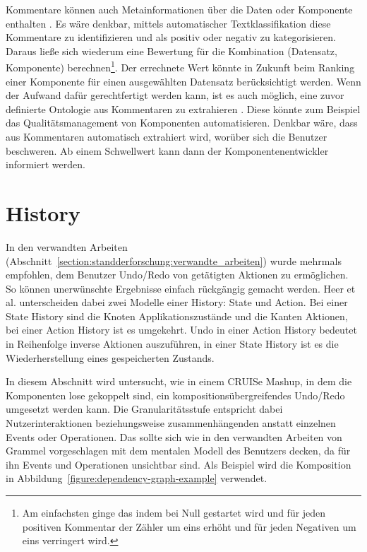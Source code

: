 \documentclass[
	headsepline,
	footsepline,
	fontsize=12pt,
	bibliography=totoc
]{scrbook}
\begin{document}

Kommentare können auch Metainformationen über die Daten oder Komponente enthalten \cite{Chen2009}. Es wäre denkbar, mittels automatischer Textklassifikation \cite{Sebastiani2002} diese Kommentare zu identifizieren und als positiv oder negativ zu kategorisieren. Daraus ließe sich wiederum eine Bewertung für die Kombination (Datensatz, Komponente) berechnen\footnote{Am einfachsten ginge das indem bei Null gestartet wird und für jeden positiven Kommentar der Zähler um eins erhöht und für jeden Negativen um eins verringert wird.}. Der errechnete Wert könnte in Zukunft beim Ranking einer Komponente für einen ausgewählten Datensatz berücksichtigt werden. Wenn der Aufwand dafür gerechtfertigt werden kann, ist es auch möglich, eine zuvor definierte Ontologie aus Kommentaren zu extrahieren \cite{Alani2003}. Diese könnte zum Beispiel das Qualitätsmanagement von Komponenten automatisieren. Denkbar wäre, dass aus Kommentaren automatisch extrahiert wird, worüber sich die Benutzer beschweren. Ab einem Schwellwert kann dann der Komponentenentwickler informiert werden.

\section{History}
\label{section:konzeption:history}


In den verwandten Arbeiten (Abschnitt~\ref{section:standderforschung:verwandte_arbeiten}) wurde mehrmals empfohlen, dem Benutzer Undo/Redo von getätigten Aktionen zu ermöglichen. So können unerwünschte Ergebnisse einfach rückgängig gemacht werden. Heer et al. \cite{Heer2008} unterscheiden dabei zwei Modelle einer History: State und Action. Bei einer State History sind die Knoten Applikationszustände und die Kanten Aktionen, bei einer Action History ist es umgekehrt. Undo in einer Action History bedeutet in Reihenfolge inverse Aktionen auszuführen, in einer State History ist es die Wiederherstellung eines gespeicherten Zustands.

In diesem Abschnitt wird untersucht, wie in einem CRUISe Mashup, in dem die Komponenten lose gekoppelt sind, ein kompositionsübergreifendes Undo/Redo umgesetzt werden kann. Die Granularitätsstufe entspricht dabei Nutzerinteraktionen beziehungsweise zusammenhängenden anstatt einzelnen Events oder Operationen. Das sollte sich wie in den verwandten Arbeiten von Grammel \cite{Grammel2012} vorgeschlagen mit dem mentalen Modell des Benutzers decken, da für ihn Events und Operationen unsichtbar sind. Als Beispiel wird die Komposition in Abbildung~\ref{figure:dependency-graph-example} verwendet.
\end{document}

